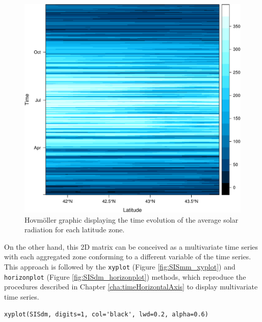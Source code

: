 \begin{figure}[htb]
\centering
\includegraphics[width=.9\linewidth]{figs/SISdm_hovmoller_lat.pdf}
\caption{\label{fig:SISdm_hovmoller_lat}Hovmöller graphic displaying the time evolution of the average solar radiation for each latitude zone.}
\end{figure}

On the other hand, this 2D matrix can be conceived as a multivariate
time series with each aggregated zone conforming to a different variable of
the time series. This approach is followed by the \texttt{xyplot} (Figure
\ref{fig:SISmm_xyplot}) and \texttt{horizonplot} (Figure \ref{fig:SISdm_horizonplot})
methods, which reproduce the procedures described in Chapter
\ref{cha:timeHorizontalAxis} to display multivariate time series.


\lstset{language=R,numbers=none}
\begin{lstlisting}
xyplot(SISdm, digits=1, col='black', lwd=0.2, alpha=0.6)
\end{lstlisting}

